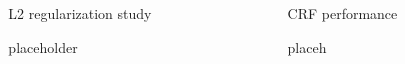 \documentclass[final]{beamer}
\newlength{\sepwid}
\newlength{\onecolwid}
\newlength{\twocolwid}
\begin{document}
\begin{frame}[t]
\begin{columns}[t]
\begin{column}{\twocolwid}
\begin{columns}[t,totalwidth=\twocolwid]
\begin{column}{\onecolwid}
\end{column} %

\begin{column}{\onecolwid} %


\begin{block}{L2 regularization study}

placeholder

\end{block}


\end{column} %

\end{columns} %

\end{column} %

\begin{column}{\sepwid}\end{column} %

\begin{column}{\onecolwid} %


\begin{block}{CRF performance}

placeh

\end{block}





\end{column}
\end{columns}
\end{frame}
\end{document}
